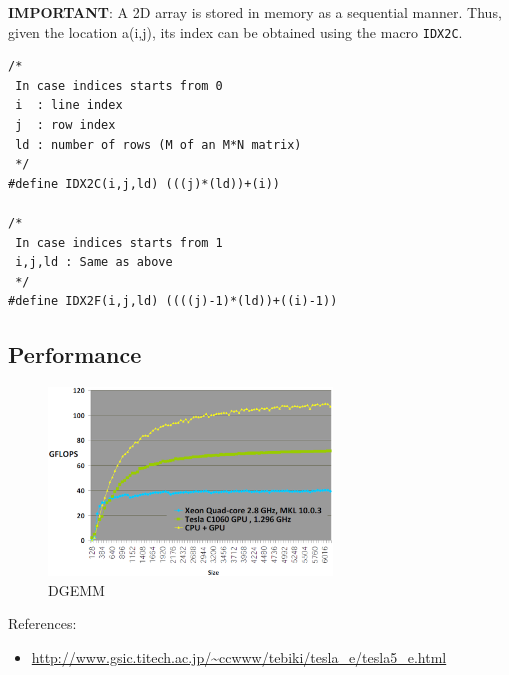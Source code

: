 {\bf IMPORTANT}: A 2D array is stored in memory as a sequential
manner. Thus, given the location a(i,j), its index can be obtained
using the macro \verb!IDX2C!.
\begin{lstlisting}
/*
 In case indices starts from 0
 i  : line index
 j  : row index
 ld : number of rows (M of an M*N matrix)
 */
#define IDX2C(i,j,ld) (((j)*(ld))+(i))

/*
 In case indices starts from 1
 i,j,ld : Same as above
 */
#define IDX2F(i,j,ld) ((((j)-1)*(ld))+((i)-1))
\end{lstlisting}


\subsection{Performance}
\label{sec:performance}

\begin{figure}[hbt]
  \centerline{\includegraphics[height=5cm,
    angle=0]{./images/dgemm.eps}}
\caption{DGEMM}
\label{fig:dgemm_cublas}
\end{figure}
References:
\begin{itemize}
\item \url{http://www.gsic.titech.ac.jp/~ccwww/tebiki/tesla_e/tesla5_e.html}
\end{itemize}


